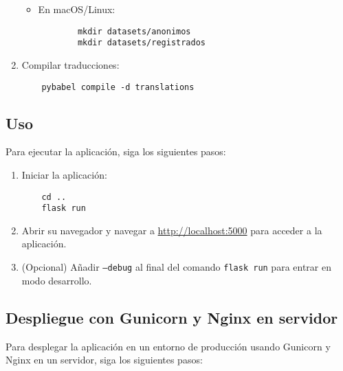 \begin{enumerate}
\begin{itemize}
        \item En macOS/Linux:
        \begin{verbatim}
        mkdir datasets/anonimos
        mkdir datasets/registrados
        \end{verbatim}
    \end{itemize}

    \item Compilar traducciones:
    \begin{verbatim}
    pybabel compile -d translations
    \end{verbatim}
\end{enumerate}

\subsection{Uso}

Para ejecutar la aplicación, siga los siguientes pasos:

\begin{enumerate}
    \item Iniciar la aplicación:
    \begin{verbatim}
    cd ..
    flask run
    \end{verbatim}

    \item Abrir su navegador y navegar a \url{http://localhost:5000} para acceder a la aplicación.

    \item (Opcional) Añadir \texttt{--debug} al final del comando \texttt{flask run} para entrar en modo desarrollo.
\end{enumerate}

\subsection{Despliegue con Gunicorn y Nginx en servidor}

Para desplegar la aplicación en un entorno de producción usando Gunicorn y Nginx en un servidor, siga los siguientes pasos:

